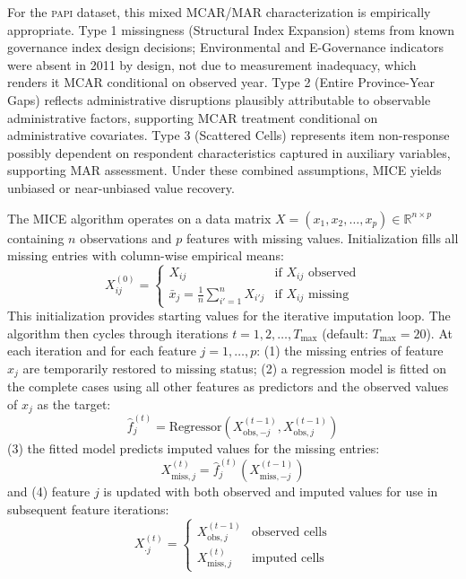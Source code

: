 \documentclass[12pt,a4paper]{article}
\newcommand{\PAPI}{\textsc{papi}\xspace}
\begin{document}
For the \PAPI dataset, this mixed MCAR/MAR characterization is empirically appropriate. Type 1 missingness (Structural Index Expansion) stems from known governance index design decisions; Environmental and E-Governance indicators were absent in 2011 by design, not due to measurement inadequacy, which renders it MCAR conditional on observed year. Type 2 (Entire Province-Year Gaps) reflects administrative disruptions plausibly attributable to observable administrative factors, supporting MCAR treatment conditional on administrative covariates. Type 3 (Scattered Cells) represents item non-response possibly dependent on respondent characteristics captured in auxiliary variables, supporting MAR assessment. Under these combined assumptions, MICE yields unbiased or near-unbiased value recovery.

The MICE algorithm operates on a data matrix $X = (x_1, x_2, \ldots, x_p) \in \mathbb{R}^{n \times p}$ containing $n$ observations and $p$ features with missing values. Initialization fills all missing entries with column-wise empirical means:
\begin{equation}
\label{eq:mice_init}
X_{ij}^{(0)} = \begin{cases} X_{ij} & \text{if } X_{ij} \text{ observed} \\ \bar{x}_j = \frac{1}{n} \sum_{i'=1}^{n} X_{i'j} & \text{if } X_{ij} \text{ missing} \end{cases}
\end{equation}
This initialization provides starting values for the iterative imputation loop. The algorithm then cycles through iterations $t = 1, 2, \ldots, T_{\max}$ (default: $T_{\max} = 20$). At each iteration and for each feature $j = 1, \ldots, p$: (1) the missing entries of feature $x_j$ are temporarily restored to missing status; (2) a regression model is fitted on the complete cases using all other features as predictors and the observed values of $x_j$ as the target:
\begin{equation}
\label{eq:mice_regress}
\hat{f}_j^{(t)} = \text{Regressor}(X_{\text{obs}, -j}^{(t-1)}, X_{\text{obs}, j}^{(t-1)})
\end{equation}
(3) the fitted model predicts imputed values for the missing entries:
\begin{equation}
\label{eq:mice_predict}
X_{\text{miss}, j}^{(t)} = \hat{f}_j^{(t)}(X_{\text{miss}, -j}^{(t-1)})
\end{equation}
and (4) feature $j$ is updated with both observed and imputed values for use in subsequent feature iterations:
\begin{equation}
\label{eq:mice_update}
X_{\cdot j}^{(t)} = \begin{cases} X_{\text{obs}, j}^{(t-1)} & \text{observed cells} \\ X_{\text{miss}, j}^{(t)} & \text{imputed cells} \end{cases}
\end{equation}
\end{document}
